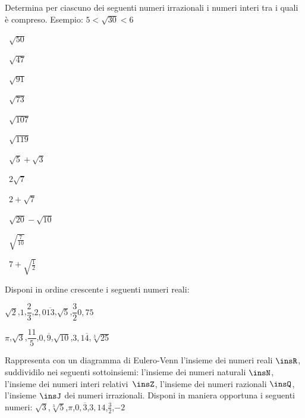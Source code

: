 \begin{esercizio}
\label{ese:1.4}
 Determina per ciascuno dei seguenti numeri irrazionali i numeri interi tra i quali è compreso. Esempio: \(5<\sqrt{30}<6\)
\begin{multicols}{4}
\begin{enumeratea}
 \item~\(\sqrt{50}\)
 \item~\(\sqrt{47}\)
 \item~\(\sqrt{91}\)
 \item~\(\sqrt{73}\)
 \item~\(\sqrt{107}\)
 \item~\(\sqrt{119}\)
 \item~\(\sqrt 5+\sqrt 3\)
 \item~\(2\sqrt 7\)
 \item~\(2+\sqrt 7\)
 \item~\(\sqrt{20}-\sqrt{10}\)
 \item~\(\sqrt{\frac 7{10}}\)
 \item~\(7+\sqrt{\frac 1 2}\)
\end{enumeratea}
\end{multicols}
\end{esercizio}

\begin{esercizio}
\label{ese:1.5}
 Disponi in ordine crescente i seguenti numeri reali:
 \begin{enumeratea}
 \item \(\sqrt 2\),\quad \(1\),\quad \(\dfrac 2 3\),\quad \(2,0\overline{13}\),\quad \(\sqrt 5\),\quad \(\dfrac 3 2\)\quad \(0,75\)
 \item \(\pi\),\quad \(\sqrt 3\),\quad \(\dfrac{11} 5\),\quad \(0,\overline 9\),\quad \(\sqrt{10}\),\quad \(3,1\overline 4\),\quad \(\sqrt[3]{25}\)
 \end{enumeratea}
\end{esercizio}

\begin{esercizio}
\label{ese:1.6}
 Rappresenta con un diagramma di Eulero-Venn l'insieme dei numeri reali \(\insR\), suddividilo nei seguenti sottoinsiemi: l'insieme dei numeri naturali \(\insN\), l'insieme dei numeri interi relativi~\(\insZ\), l'insieme dei numeri razionali \(\insQ\), l'insieme \(\insJ\) dei numeri irrazionali. Disponi in maniera opportuna i seguenti numeri: \(\sqrt 3\),\quad \(\sqrt[3]5\),\quad\(\pi\),\quad \(0,\overline 3\),\quad \(3,14\),\quad \(\frac 3 2\),\quad\(-2\)
\end{esercizio}

